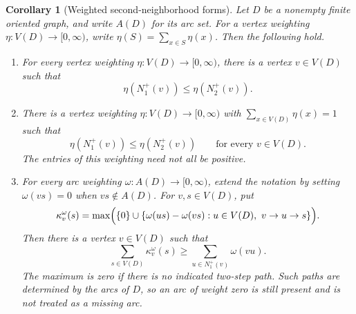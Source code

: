 \documentclass[11pt]{article}
\newtheorem{corollary}[theorem]{Corollary}
\theoremstyle{remark}
\begin{document}
\begin{corollary}[Weighted second-neighborhood forms]\label{cor:weighted-forms}
Let \(D\) be a nonempty finite oriented graph, and write \(A(D)\) for its
arc set.  For a vertex weighting \(\eta:V(D)\to[0,\infty)\), write
\(\eta(S)=\sum_{x\in S}\eta(x)\).  Then the following hold.
\begin{enumerate}[label=\textup{(\roman*)}]
\item For every vertex weighting \(\eta:V(D)\to[0,\infty)\), there is a
vertex \(v\in V(D)\) such that
\[
 \eta(N_1^+(v))\leq\eta(N_2^+(v)).
\]

\item There is a vertex weighting \(\eta:V(D)\to[0,\infty)\) with
\(\sum_{x\in V(D)}\eta(x)=1\) such that
\[
 \eta(N_1^+(v))\leq\eta(N_2^+(v))\qquad\text{for every }v\in V(D).
\]
The entries of this weighting need not all be positive.

\item For every arc weighting \(\omega:A(D)\to[0,\infty)\), extend the
notation by setting \(\omega(vs)=0\) when \(vs\notin A(D)\).  For
\(v,s\in V(D)\), put
\[
 \kappa_v^\omega(s)=\max\Bigl(\{0\}\cup
 \{\omega(us)-\omega(vs):u\in V(D),\ v\to u\to s\}\Bigr).
\]
Then there is a vertex \(v\in V(D)\) such that
\[
 \sum_{s\in V(D)}\kappa_v^\omega(s)
 \geq \sum_{u\in N_1^+(v)}\omega(vu).
\]
The maximum is zero if there is no indicated two-step path.  Such paths
are determined by the arcs of \(D\), so an arc of weight zero is still
present and is not treated as a missing arc.
\end{enumerate}
\end{corollary}
\end{document}
